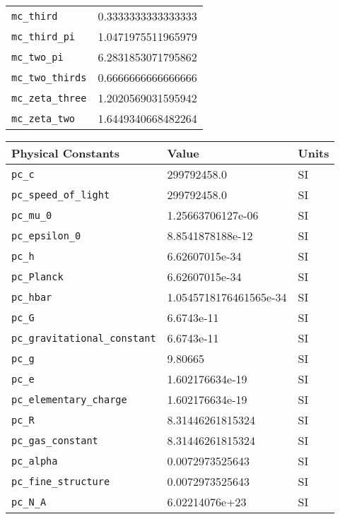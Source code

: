 \begin{tabular}{ll}
{\tt mc\_third} \index{mc\_third}  & 0.3333333333333333 \\
{\tt mc\_third\_pi} \index{mc\_third\_pi}  & 1.0471975511965979 \\
{\tt mc\_two\_pi} \index{mc\_two\_pi}  & 6.2831853071795862 \\
{\tt mc\_two\_thirds} \index{mc\_two\_thirds}  & 0.6666666666666666 \\
{\tt mc\_zeta\_three} \index{mc\_zeta\_three}  & 1.2020569031595942 \\
{\tt mc\_zeta\_two} \index{mc\_zeta\_two}  & 1.6449340668482264 \\
\end{tabular}


\begin{tabular}{lll} \hline
Physical Constants & Value & Units \\ \hline
{\tt pc\_c} \index{pc\_c}  & 299792458.0 & SI \\
{\tt pc\_speed\_of\_light} \index{pc\_speed\_of\_light}  & 299792458.0 & SI \\
{\tt pc\_mu\_0} \index{pc\_mu\_0}  & 1.25663706127e-06 & SI \\
{\tt pc\_epsilon\_0} \index{pc\_epsilon\_0}  & 8.8541878188e-12 & SI \\
{\tt pc\_h} \index{pc\_h}  & 6.62607015e-34 & SI \\
{\tt pc\_Planck} \index{pc\_Planck}  & 6.62607015e-34 & SI \\
{\tt pc\_hbar} \index{pc\_hbar}  & 1.0545718176461565e-34 & SI \\
{\tt pc\_G} \index{pc\_G}  & 6.6743e-11 & SI \\
{\tt pc\_gravitational\_constant} \index{pc\_gravitational\_constant}  & 6.6743e-11 & SI \\
{\tt pc\_g} \index{pc\_g}  & 9.80665 & SI \\
{\tt pc\_e} \index{pc\_e}  & 1.602176634e-19 & SI \\
{\tt pc\_elementary\_charge} \index{pc\_elementary\_charge}  & 1.602176634e-19 & SI \\
{\tt pc\_R} \index{pc\_R}  & 8.31446261815324 & SI \\
{\tt pc\_gas\_constant} \index{pc\_gas\_constant}  & 8.31446261815324 & SI \\
{\tt pc\_alpha} \index{pc\_alpha}  & 0.0072973525643 & SI \\
{\tt pc\_fine\_structure} \index{pc\_fine\_structure}  & 0.0072973525643 & SI \\
{\tt pc\_N\_A} \index{pc\_N\_A}  & 6.02214076e+23 & SI \\

\end{tabular}
